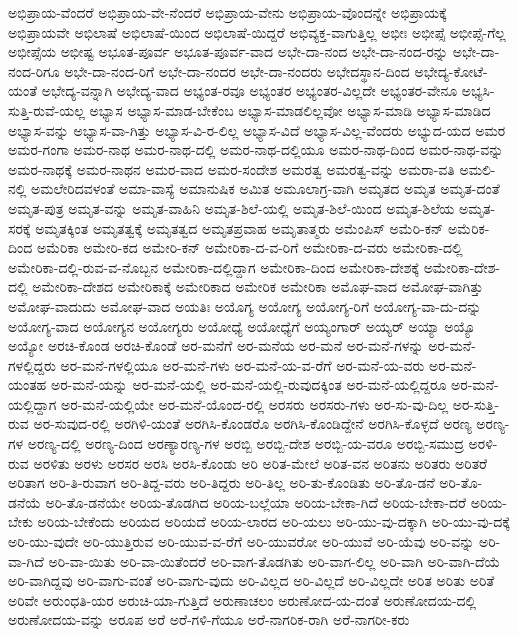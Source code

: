 {ಅಭಿಪ್ರಾಯ-ವೆಂದರೆ
ಅಭಿಪ್ರಾಯ-ವೇ-ನೆಂದರೆ
ಅಭಿಪ್ರಾಯ-ವೇನು
ಅಭಿಪ್ರಾಯ-ವೊಂದನ್ನೇ
ಅಭಿಪ್ರಾಯಕ್ಕೆ
ಅಭಿಪ್ರಾಯವೇ
ಅಭಿಲಾಷೆ
ಅಭಿಲಾಷೆ-ಯಿಂದ
ಅಭಿಲಾಷೆ-ಯಿದ್ದರೆ
ಅಭಿವ್ಯಕ್ತ-ವಾಗುತ್ತಿಲ್ಲ
ಅಭೀಃ
ಅಭೀಪ್ಸೆ
ಅಭೀಪ್ಸೆ-ಗೆಲ್ಲ
ಅಭೀಪ್ಸೆಯ
ಅಭೀಷ್ಟ
ಅಭೂತ-ಪೂರ್ವ
ಅಭೂತ-ಪೂರ್ವ-ವಾದ
ಅಭೇ-ದಾ-ನಂದ
ಅಭೇ-ದಾ-ನಂದ-ರನ್ನು
ಅಭೇ-ದಾ-ನಂದ-ರಿಗೂ
ಅಭೇ-ದಾ-ನಂದ-ರಿಗೆ
ಅಭೇ-ದಾ-ನಂದರ
ಅಭೇ-ದಾ-ನಂದರು
ಅಭೇದಸ್ಥಾನ-ದಿಂದ
ಅಭೇದ್ಯ-ಕೋಟೆ-ಯಂತೆ
ಅಭೇದ್ಯ-ವನ್ನಾಗಿ
ಅಭೇದ್ಯ-ವಾದ
ಅಭ್ಯಂತ-ರವೂ
ಅಭ್ಯಂತರ
ಅಭ್ಯಂತರ-ವಿಲ್ಲದೇ
ಅಭ್ಯಂತರ-ವೇನೂ
ಅಭ್ಯಸಿ-ಸುತ್ತಿ-ರುವೆ-ಯಲ್ಲ
ಅಭ್ಯಾಸ
ಅಭ್ಯಾಸ-ಮಾಡ-ಬೇಕೆಂಬ
ಅಭ್ಯಾಸ-ಮಾಡಲಿಲ್ಲವೋ
ಅಭ್ಯಾಸ-ಮಾಡಿ
ಅಭ್ಯಾಸ-ಮಾಡಿದ
ಅಭ್ಯಾಸ-ವನ್ನು
ಅಭ್ಯಾಸ-ವಾ-ಗಿತ್ತು
ಅಭ್ಯಾಸ-ವಿ-ರ-ಲಿಲ್ಲ
ಅಭ್ಯಾಸ-ವಿದೆ
ಅಭ್ಯಾಸ-ವಿಲ್ಲ-ವೆಂದರು
ಅಭ್ಯುದ-ಯದ
ಅಮರ
ಅಮರ-ಗಂಗಾ
ಅಮರ-ನಾಥ
ಅಮರ-ನಾಥ-ದಲ್ಲಿ
ಅಮರ-ನಾಥ-ದಲ್ಲಿಯೂ
ಅಮರ-ನಾಥ-ದಿಂದ
ಅಮರ-ನಾಥ-ವನ್ನು
ಅಮರ-ನಾಥಕ್ಕೆ
ಅಮರ-ನಾಥನ
ಅಮರ-ವಾದ
ಅಮರ-ಸಂದೇಶ
ಅಮರತ್ವ
ಅಮರತ್ವ-ವನ್ನು
ಅಮರಾ-ವತಿ
ಅಮಲಿ-ನಲ್ಲಿ
ಅಮಲೇರಿದವಳಂತೆ
ಅಮಾ-ವಾಸ್ಯೆ
ಅಮಾನುಷಿಕ
ಅಮಿತ
ಅಮೂಲಾಗ್ರ-ವಾಗಿ
ಅಮೃತದ
ಅಮೃತ
ಅಮೃತ-ದಂತೆ
ಅಮೃತ-ಪುತ್ರ
ಅಮೃತ-ವನ್ನು
ಅಮೃತ-ವಾಹಿನಿ
ಅಮೃತ-ಶಿಲೆ-ಯಲ್ಲಿ
ಅಮೃತ-ಶಿಲೆ-ಯಿಂದ
ಅಮೃತ-ಶಿಲೆಯ
ಅಮೃತ-ಸರಕ್ಕೆ
ಅಮೃತಕ್ಕಿಂತ
ಅಮೃತತ್ವಕ್ಕೆ
ಅಮೃತತ್ವದ
ಅಮೃತಪ್ರವಾಹ
ಅಮೃತಾತ್ಮರು
ಅಮೆಂಪಿಸ್
ಅಮೆರಿ-ಕನ್
ಅಮೆರಿಕ-ದಿಂದ
ಅಮೆರಿಕಾ
ಅಮೇರಿ-ಕದ
ಅಮೇರಿ-ಕನ್
ಅಮೇರಿಕಾ-ದ-ವ-ರಿಗೆ
ಅಮೇರಿಕಾ-ದ-ವರು
ಅಮೇರಿಕಾ-ದಲ್ಲಿ
ಅಮೇರಿಕಾ-ದಲ್ಲಿ-ರುವ-ವ-ನೊಬ್ಬನ
ಅಮೇರಿಕಾ-ದಲ್ಲಿದ್ದಾಗ
ಅಮೇರಿಕಾ-ದಿಂದ
ಅಮೇರಿಕಾ-ದೇಶಕ್ಕೆ
ಅಮೇರಿಕಾ-ದೇಶ-ದಲ್ಲಿ
ಅಮೇರಿಕಾ-ದೇಶದ
ಅಮೇರಿಕಾಕ್ಕೆ
ಅಮೇರಿಕಾದ
ಅಮೇರಿಕ
ಅಮೇರಿಕಾ
ಅಮೊಘ-ವಾದ
ಅಮೋಘ-ವಾಗಿತ್ತು
ಅಮೋಘ-ವಾದುದು
ಅಮೋಘ-ವಾದ
ಅಯತಿಃ
ಅಯೊಗ್ಯ
ಅಯೋಗ್ಯ
ಅಯೋಗ್ಯ-ರಿಗೆ
ಅಯೋಗ್ಯ-ವಾ-ದು-ದನ್ನು
ಅಯೋಗ್ಯ-ವಾದ
ಅಯೋಗ್ಯನ
ಅಯೋಗ್ಯರು
ಅಯೋಧ್ಯೆ
ಅಯೋಧ್ಯೆಗೆ
ಅಯ್ಯಂಗಾರ್
ಅಯ್ಯರ್
ಅಯ್ಯಾ
ಅಯ್ಯೊ
ಅಯ್ಯೋ
ಅರಚಿ-ಕೊಂಡ
ಅರಚಿ-ಕೊಂಡೆ
ಅರ-ಮನೆಗೆ
ಅರ-ಮನೆಯ
ಅರ-ಮನೆ
ಅರ-ಮನೆ-ಗಳನ್ನು
ಅರ-ಮನೆ-ಗಳಲ್ಲಿದ್ದರು
ಅರ-ಮನೆ-ಗಳಲ್ಲಿಯೂ
ಅರ-ಮನೆ-ಗಳು
ಅರ-ಮನೆ-ಯ-ವ-ರೆಗೆ
ಅರ-ಮನೆ-ಯ-ವರು
ಅರ-ಮನೆ-ಯಂತಹ
ಅರ-ಮನೆ-ಯನ್ನು
ಅರ-ಮನೆ-ಯಲ್ಲಿ
ಅರ-ಮನೆ-ಯಲ್ಲಿ-ರುವುದಕ್ಕಿಂತ
ಅರ-ಮನೆ-ಯಲ್ಲಿದ್ದರೂ
ಅರ-ಮನೆ-ಯಲ್ಲಿದ್ದಾಗ
ಅರ-ಮನೆ-ಯಲ್ಲಿಯೇ
ಅರ-ಮನೆ-ಯೊಂದ-ರಲ್ಲಿ
ಅರಸರು
ಅರಸರು-ಗಳು
ಅರ-ಸು-ವು-ದಿಲ್ಲ
ಅರ-ಸುತ್ತಿ-ರುವ
ಅರ-ಸುವುದ-ರಲ್ಲಿ
ಅರಗಿಳಿ-ಯಂತೆ
ಅರಗಿಸಿ-ಕೊಂಡರೊ
ಅರಗಿಸಿ-ಕೊಂಡಿದ್ದೇನೆ
ಅರಗಿಸಿ-ಕೊಳ್ಳದೆ
ಅರಣ್ಯ
ಅರಣ್ಯ-ಗಳ
ಅರಣ್ಯ-ದಲ್ಲಿ
ಅರಣ್ಯ-ದಿಂದ
ಅರಣ್ಯಾರಣ್ಯ-ಗಳ
ಅರಬ್ಬಿ
ಅರಬ್ಬಿ-ದೇಶ
ಅರಬ್ಬಿ-ಯ-ವರೂ
ಅರಬ್ಬಿ-ಸಮುದ್ರ
ಅರಳಿ-ರುವ
ಅರಳಿತು
ಅರಳು
ಅರಸರ
ಅರಸಿ
ಅರಸಿ-ಕೊಂಡು
ಅರಿ
ಅರಿತ-ಮೇಲೆ
ಅರಿತ-ವನ
ಅರಿತನು
ಅರಿತರು
ಅರಿತರೆ
ಅರಿತಾಗ
ಅರಿ-ತಿ-ರುವಾಗ
ಅರಿ-ತಿದ್ದ-ವರು
ಅರಿ-ತಿದ್ದರು
ಅರಿ-ತಿಲ್ಲ
ಅರಿ-ತು-ಕೊಂಡಿತು
ಅರಿ-ತೊ-ಡನೆ
ಅರಿ-ತೊ-ಡನೆಯೆ
ಅರಿ-ತೊ-ಡನೆಯೇ
ಅರಿಯ-ತೊಡಗಿದ
ಅರಿಯ-ಬಲ್ಲೆಯಾ
ಅರಿಯ-ಬೇಕಾ-ಗಿದೆ
ಅರಿಯ-ಬೇಕಾ-ದರೆ
ಅರಿಯ-ಬೇಕು
ಅರಿಯ-ಬೇಕೆಂದು
ಅರಿಯದ
ಅರಿಯದೆ
ಅರಿಯ-ಲಾರದ
ಅರಿ-ಯಲು
ಅರಿ-ಯು-ವು-ದಕ್ಕಾಗಿ
ಅರಿ-ಯು-ವು-ದಕ್ಕೆ
ಅರಿ-ಯು-ವುದೇ
ಅರಿ-ಯುತ್ತಿರುವ
ಅರಿ-ಯುವ-ವ-ರೆಗೆ
ಅರಿ-ಯುವರೋ
ಅರಿ-ಯುವೆ
ಅರಿ-ಯೆವು
ಅರಿ-ವನ್ನು
ಅರಿ-ವಾ-ಗಿದೆ
ಅರಿ-ವಾ-ಯಿತು
ಅರಿ-ವಾ-ಯಿತೆಂದರೆ
ಅರಿ-ವಾಗ-ತೊಡಗಿತು
ಅರಿ-ವಾಗ-ಲಿಲ್ಲ
ಅರಿ-ವಾಗಿ
ಅರಿ-ವಾಗಿ-ದೆಯೆ
ಅರಿ-ವಾಗಿದ್ದವು
ಅರಿ-ವಾಗು-ವಂತೆ
ಅರಿ-ವಾಗು-ವುದು
ಅರಿ-ವಿಲ್ಲದ
ಅರಿ-ವಿಲ್ಲದೆ
ಅರಿ-ವಿಲ್ಲದೇ
ಅರಿತ
ಅರಿತು
ಅರಿತೆ
ಅರಿವೇ
ಅರುಂಧತಿ-ಯರ
ಅರುಚಿ-ಯಾ-ಗುತ್ತಿದೆ
ಅರುಣಾಚಲಂ
ಅರುಣೋದ-ಯ-ದಂತೆ
ಅರುಣೋದಯ-ದಲ್ಲಿ
ಅರುಣೋದಯ-ವನ್ನು
ಅರೂಪ
ಅರೆ
ಅರೆ-ಗಳಿ-ಗೆಯೂ
ಅರೆ-ನಾಗರಿಕ-ರಾಗಿ
ಅರೆ-ನಾಗರೀ-ಕರು
}
